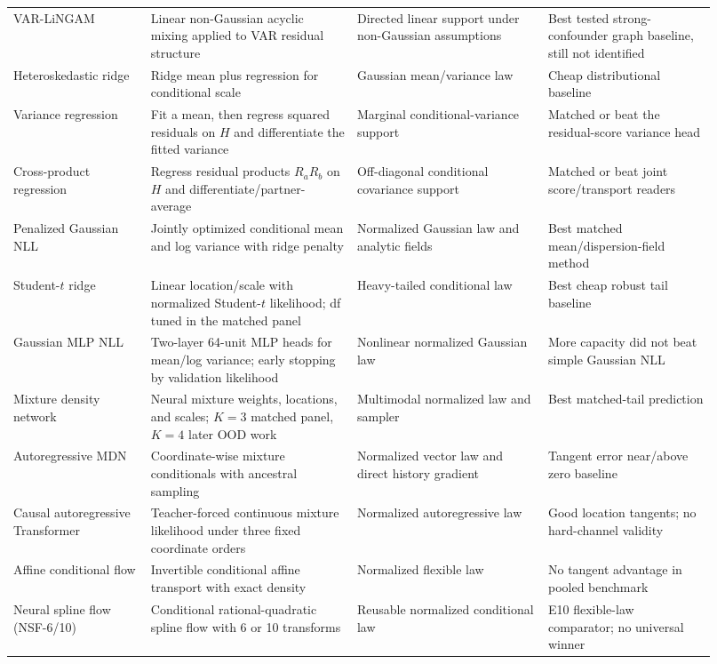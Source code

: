 \documentclass[10pt]{article}
\begin{document}
\begin{longtable}{L{0.18\linewidth}L{0.27\linewidth}L{0.25\linewidth}L{0.22\linewidth}}
VAR-LiNGAM & Linear non-Gaussian acyclic mixing applied to VAR residual structure & Directed linear support under non-Gaussian assumptions & Best tested strong-confounder graph baseline, still not identified \\
Heteroskedastic ridge & Ridge mean plus regression for conditional scale & Gaussian mean/variance law & Cheap distributional baseline \\
Variance regression & Fit a mean, then regress squared residuals on $H$ and differentiate the fitted variance & Marginal conditional-variance support & Matched or beat the residual-score variance head \\
Cross-product regression & Regress residual products $R_aR_b$ on $H$ and differentiate/partner-average & Off-diagonal conditional covariance support & Matched or beat joint score/transport readers \\
Penalized Gaussian NLL & Jointly optimized conditional mean and log variance with ridge penalty & Normalized Gaussian law and analytic fields & Best matched mean/dispersion-field method \\
Student-$t$ ridge & Linear location/scale with normalized Student-$t$ likelihood; df tuned in the matched panel & Heavy-tailed conditional law & Best cheap robust tail baseline \\
Gaussian MLP NLL & Two-layer 64-unit MLP heads for mean/log variance; early stopping by validation likelihood & Nonlinear normalized Gaussian law & More capacity did not beat simple Gaussian NLL \\
Mixture density network & Neural mixture weights, locations, and scales; $K=3$ matched panel, $K=4$ later OOD work & Multimodal normalized law and sampler & Best matched-tail prediction \\
Autoregressive MDN & Coordinate-wise mixture conditionals with ancestral sampling & Normalized vector law and direct history gradient & Tangent error near/above zero baseline \\
Causal autoregressive Transformer & Teacher-forced continuous mixture likelihood under three fixed coordinate orders & Normalized autoregressive law & Good location tangents; no hard-channel validity \\
Affine conditional flow & Invertible conditional affine transport with exact density & Normalized flexible law & No tangent advantage in pooled benchmark \\
Neural spline flow (NSF-6/10) & Conditional rational-quadratic spline flow with 6 or 10 transforms & Reusable normalized conditional law & E10 flexible-law comparator; no universal winner \\
\bottomrule
\end{longtable}
\end{document}
